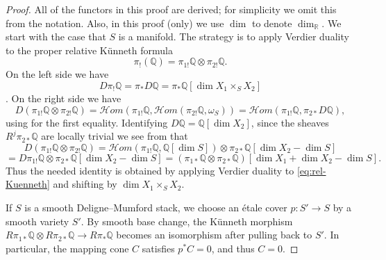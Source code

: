 \documentclass[11pt,reqno]{amsart}
\theoremstyle{plain} %
\theoremstyle{definition}
\newcommand{\QQ}{\mathbb{Q}}
\newcommand{\mc}{\mathcal}
\newcommand{\R}{\mathbb{R}}
\begin{document}
\begin{proof}
    All of the functors in this proof are derived; for simplicity we omit this from the notation. Also, in this proof (only) we use $\dim$ to denote $\dim_{\R}$. We start with the case that $S$ is a manifold. The strategy is to apply Verdier duality to the proper relative K\"unneth formula \cite[Exercise II.18(i)]{Kashiwara-Schapira}
    \begin{equation} \label{eq:rel-Kuenneth}
    \pi_!(\QQ) = \pi_{1!} \QQ \otimes \pi_{2!} \QQ.
    \end{equation}
    On the left side we have
    $$D\pi_!\QQ = \pi_* D \QQ = \pi_*\QQ[\dim X_1 \times_S X_2]$$
    \cite[Theorem 3.2.17(iii) and Proposition 3.3.7]{Dimca}. %
    On the right side we have
    $$D(\pi_{1!} \QQ \otimes \pi_{2!} \QQ)  = \mc Hom(\pi_{1!} \QQ, \mc Hom(\pi_{2!} \QQ, \omega_S)) = \mc Hom(\pi_{1!} \QQ, \pi_{2*} D\QQ),$$
    using \cite[Proposition 2.6.3(ii)]{Kashiwara-Schapira} for the first equality. Identifying $D\QQ = \QQ[\dim X_2]$, since the sheaves $R^j\pi_{2*} \QQ$ are locally trivial we see from \cite[p.~624]{dC-Migliorini} that
    $$D(\pi_{1!} \QQ \otimes \pi_{2!} \QQ) =  \mc Hom(\pi_{1!} \QQ, \QQ[\dim S]) \otimes \pi_{2*} \QQ[\dim X_2 - \dim S] 
    $$
    $$= D\pi_{1!} \QQ \otimes \pi_{2 *} \QQ[\dim X_2 - \dim S] =  (\pi_{1*} \QQ \otimes \pi_{2*} \QQ)[\dim X_1 + \dim X_2 - \dim S].$$
    Thus the needed identity is obtained by applying Verdier duality to \eqref{eq:rel-Kuenneth} and shifting by $\dim X_1 \times_S X_2$. 

If $S$ is a smooth Deligne--Mumford stack, we choose an \'etale cover $p: S' \to S$ by a smooth variety $S'$. By smooth base change, the K\"unneth morphism $R\pi_{1*} \QQ \otimes R\pi_{2*} \QQ \to R\pi_* \QQ$ becomes an isomorphism after pulling back to $S'$. In particular, the mapping cone $C$ satisfies $p^* C = 0$, and thus $C = 0$.
\end{proof}
\end{document}
